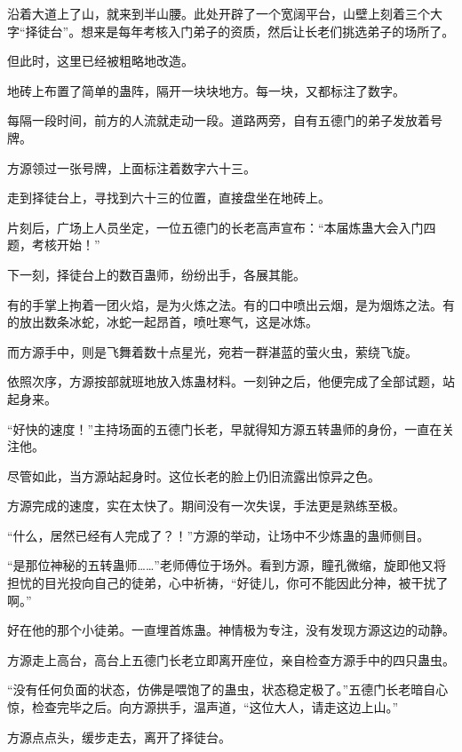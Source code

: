 
\begin{this_body}

沿着大道上了山，就来到半山腰。此处开辟了一个宽阔平台，山壁上刻着三个大字“择徒台”。想来是每年考核入门弟子的资质，然后让长老们挑选弟子的场所了。

但此时，这里已经被粗略地改造。

地砖上布置了简单的蛊阵，隔开一块块地方。每一块，又都标注了数字。

每隔一段时间，前方的人流就走动一段。道路两旁，自有五德门的弟子发放着号牌。

方源领过一张号牌，上面标注着数字六十三。

走到择徒台上，寻找到六十三的位置，直接盘坐在地砖上。

片刻后，广场上人员坐定，一位五德门的长老高声宣布：“本届炼蛊大会入门四题，考核开始！”

下一刻，择徒台上的数百蛊师，纷纷出手，各展其能。

有的手掌上拘着一团火焰，是为火炼之法。有的口中喷出云烟，是为烟炼之法。有的放出数条冰蛇，冰蛇一起昂首，喷吐寒气，这是冰炼。

而方源手中，则是飞舞着数十点星光，宛若一群湛蓝的萤火虫，萦绕飞旋。

依照次序，方源按部就班地放入炼蛊材料。一刻钟之后，他便完成了全部试题，站起身来。

“好快的速度！”主持场面的五德门长老，早就得知方源五转蛊师的身份，一直在关注他。

尽管如此，当方源站起身时。这位长老的脸上仍旧流露出惊异之色。

方源完成的速度，实在太快了。期间没有一次失误，手法更是熟练至极。

“什么，居然已经有人完成了？！”方源的举动，让场中不少炼蛊的蛊师侧目。

“是那位神秘的五转蛊师……”老师傅位于场外。看到方源，瞳孔微缩，旋即他又将担忧的目光投向自己的徒弟，心中祈祷，“好徒儿，你可不能因此分神，被干扰了啊。”

好在他的那个小徒弟。一直埋首炼蛊。神情极为专注，没有发现方源这边的动静。

方源走上高台，高台上五德门长老立即离开座位，亲自检查方源手中的四只蛊虫。

“没有任何负面的状态，仿佛是喂饱了的蛊虫，状态稳定极了。”五德门长老暗自心惊，检查完毕之后。向方源拱手，温声道，“这位大人，请走这边上山。”

方源点点头，缓步走去，离开了择徒台。


\end{this_body}

